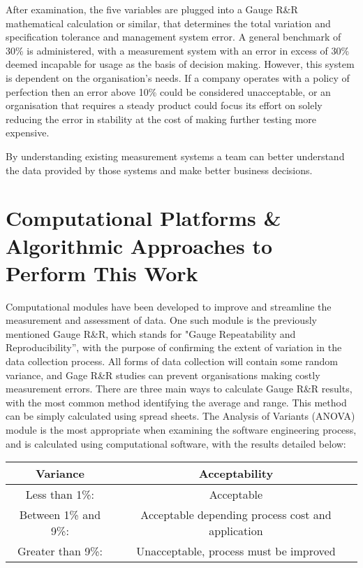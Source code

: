 \documentclass{article}
\begin{document}
After examination, the five variables are plugged into a Gauge R\&R mathematical calculation or similar, that determines the total variation and specification tolerance and management system error. A general benchmark of 30\% is administered, with a measurement system with an error in excess of 30\% deemed incapable for usage as the basis of decision making. However, this system is dependent on the organisation's needs. If a company operates with a policy of perfection then an error above 10\% could be considered unacceptable, or an organisation that requires a steady product could focus its effort on solely reducing the error in stability at the cost of making further testing more expensive. \newline

By understanding existing measurement systems a team can better understand the data provided by those systems and make better business decisions. \cite{morestream}

\section{Computational Platforms \& Algorithmic Approaches to Perform This Work} Computational modules have been developed to improve and streamline the measurement and assessment of data. One such module is the previously mentioned Gauge R\&R, which stands for "Gauge Repeatability and Reproducibility'', with the purpose of confirming the extent of variation in the data collection process. All forms of data collection will contain some random variance, and Gage R\&R studies can prevent organisations making costly measurement errors. There are three main ways to calculate Gauge R\&R results, with the most common method identifying the average and range. This method can be simply calculated using spread sheets. The Analysis of Variants (ANOVA) module is the most appropriate when examining the software engineering process, and is calculated using computational software, with the results detailed below:

\begin{center}
\begin{tabular}{||c c||} 
\hline
Variance & Acceptability \\ 
\hline
Less than 1\%: & Acceptable \\ 
\hline
Between 1\% and 9\%: & Acceptable depending process cost and application \\
\hline
Greater than 9\%: & Unacceptable, process must be improved \\
\hline
\end{tabular}
\end{center}
\end{document}
